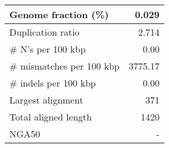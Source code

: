 \documentclass[12pt,a4paper]{article}
\begin{document}
\begin{table}[ht]
\begin{center}
\begin{tabular}{|l*{1}{|r}|}
Genome fraction (\%) & 0.029 \\ \hline
Duplication ratio & 2.714 \\ \hline
\# N's per 100 kbp & 0.00 \\ \hline
\# mismatches per 100 kbp & 3775.17 \\ \hline
\# indels per 100 kbp & 0.00 \\ \hline
Largest alignment & 371 \\ \hline
Total aligned length & 1420 \\ \hline
NGA50 & - \\ \hline
\end{tabular}
\end{center}
\end{table}
\end{document}
